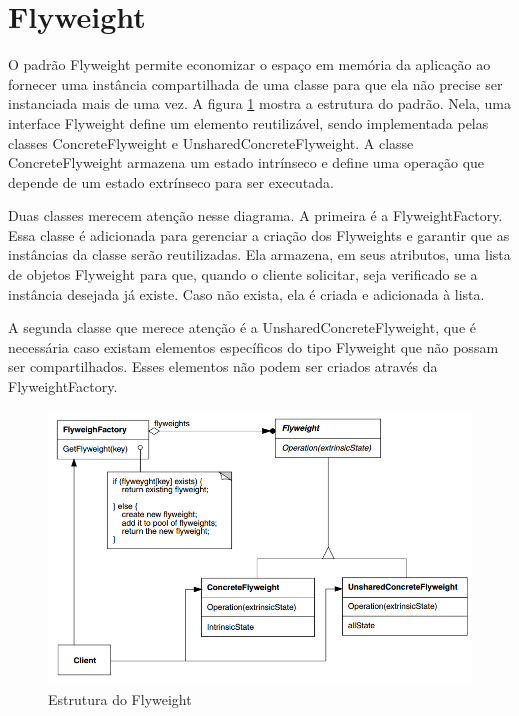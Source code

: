 \section{Flyweight}

O padrão Flyweight permite economizar o espaço em memória 
da aplicação ao fornecer uma instância compartilhada de 
uma classe para que ela não precise ser instanciada 
mais de uma vez. A figura \ref{flyweight_struct} mostra 
a estrutura do padrão. Nela, uma interface Flyweight 
define um elemento reutilizável, sendo implementada 
pelas classes ConcreteFlyweight e UnsharedConcreteFlyweight. 
A classe ConcreteFlyweight armazena um estado intrínseco 
e define uma operação que depende de um estado extrínseco 
para ser executada. 

Duas classes merecem atenção nesse diagrama. A primeira 
é a FlyweightFactory. Essa classe é adicionada para 
gerenciar a criação dos Flyweights e garantir que as 
instâncias da classe serão reutilizadas. Ela armazena, em 
seus atributos, uma lista de objetos Flyweight para que, 
quando o cliente solicitar, seja verificado se a instância 
desejada já existe. Caso não exista, ela é criada e 
adicionada à lista. 

A segunda classe que merece atenção é a UnsharedConcreteFlyweight, 
que é necessária caso existam elementos específicos 
do tipo Flyweight que não possam ser compartilhados. 
Esses elementos não podem ser criados através da 
FlyweightFactory.

\begin{figure}[htb]
	\caption{\label{flyweight_struct}Estrutura do Flyweight}
	\begin{center}
	    \includegraphics[scale=0.5]{5_padroes-contexto-funcional/5.2_estruturais/5.2.6_flyweight/diagram.png}
	\end{center}
\end{figure}

